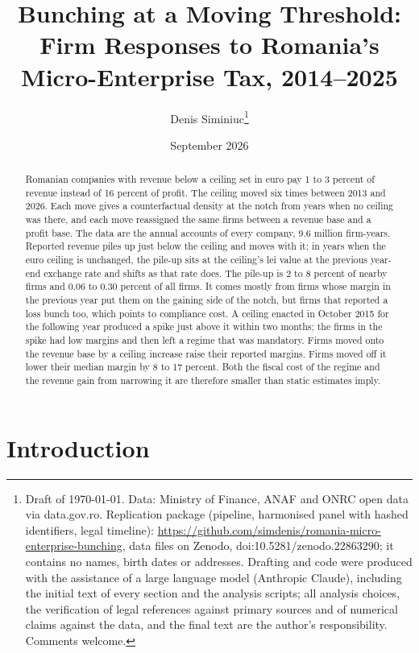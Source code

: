 \documentclass[12pt]{article}
\title{Bunching at a Moving Threshold:\\ Firm Responses to Romania's Micro-Enterprise Tax, 2014--2025}
\author{Denis Siminiuc\thanks{Draft of \today. Data: Ministry of Finance, ANAF and ONRC open data via data.gov.ro. Replication package (pipeline, harmonised panel with hashed identifiers, legal timeline): \url{https://github.com/simdenis/romania-micro-enterprise-bunching}, data files on Zenodo, doi:10.5281/zenodo.22863290; it contains no names, birth dates or addresses. Drafting and code were produced with the assistance of a large language model (Anthropic Claude), including the initial text of every section and the analysis scripts; all analysis choices, the verification of legal references against primary sources and of numerical claims against the data, and the final text are the author's responsibility. Comments welcome.}}
\date{September 2026}
\begin{document}
\maketitle

\begin{abstract}
\noindent Romanian companies with revenue below a ceiling set in euro pay 1 to 3 percent of revenue instead of 16 percent of profit. The ceiling moved six times between 2013 and 2026. Each move gives a counterfactual density at the notch from years when no ceiling was there, and each move reassigned the same firms between a revenue base and a profit base. The data are the annual accounts of every company, 9.6 million firm-years. Reported revenue piles up just below the ceiling and moves with it; in years when the euro ceiling is unchanged, the pile-up sits at the ceiling's lei value at the previous year-end exchange rate and shifts as that rate does. The pile-up is 2 to 8 percent of nearby firms and 0.06 to 0.30 percent of all firms. It comes mostly from firms whose margin in the previous year put them on the gaining side of the notch, but firms that reported a loss bunch too, which points to compliance cost. A ceiling enacted in October 2015 for the following year produced a spike just above it within two months; the firms in the spike had low margins and then left a regime that was mandatory. Firms moved onto the revenue base by a ceiling increase raise their reported margins. Firms moved off it lower their median margin by 8 to 17 percent. Both the fiscal cost of the regime and the revenue gain from narrowing it are therefore smaller than static estimates imply.
\end{abstract}

\section{Introduction}
\end{document}
